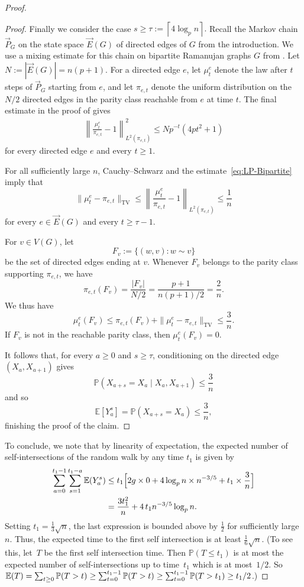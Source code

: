 \documentclass[11pt,a4paper]{article}
\theoremstyle{plain}
\newcommand{\Exp}{\mathop{\null\mathbb{E}}}
\renewcommand{\Pr}{\mathbb{P}}
\begin{document}
\begin{proof}
\begin{proof}
Finally we consider the case
$
s\geq 
\tau:=\left\lceil4\log_p n\right\rceil.
$
Recall the Markov chain $\vec P_G$ on the state space $\vec E(G)$ of directed edges of $G$ from the introduction. We use a mixing estimate for this chain on bipartite Ramanujan graphs $G$ from
\cite{LubetzkyPeres}. Let
$
N:=|\vec E(G)|=n(p+1).
$
For a directed edge $e$, let $\mu_t^e$ denote the law after $t$
steps of $\vec P_G$ starting from $e$,
and let $\pi_{e,t}$ denote the uniform distribution on the $N/2$
directed edges in the parity class reachable from $e$ at time $t$.
The final estimate in the proof of \cite[Corollary~3.8]{LubetzkyPeres} gives
\begin{align}\label{eq:LP-Bipartite}
\left\|
\frac{\mu_t^e}{\pi_{e,t}}-1
\right\|_{L^2(\pi_{e,t})}^2
\le
Np^{-t}\left(4pt^2+1\right)
\end{align}
for every directed edge $e$ and every $t\ge1$.

For all sufficiently large $n$, Cauchy--Schwarz and the estimate~\eqref{eq:LP-Bipartite} imply that
\[
\|\mu_t^e - \pi_{e,t}\|_{\textrm{TV}}
\leq
\left\|
\frac{\mu_t^e}{\pi_{e,t}}-1
\right\|_{L^2(\pi_{e,t})}
\le
\frac1n
\]
for every $e\in\vec E(G)$ and every $t\ge\tau-1$.

For $v\in V(G)$, let
\[
F_v:=\{(w,v):w\sim v\}
\]
be the set of directed edges ending at $v$. Whenever $F_v$ belongs
to the parity class supporting $\pi_{e,t}$, we have
\[
\pi_{e,t}(F_v)
=
\frac{|F_v|}{N/2}
=
\frac{p+1}{n(p+1)/2}
=
\frac2n.
\]
We thus have
\[
\mu_t^e(F_v)
\le
\pi_{e,t}(F_v)
+
\|\mu_t^e - \pi_{e,t}\|_{\textrm{TV}}
\le
\frac3n.
\]
If $F_v$ is not in the reachable parity class, then $\mu_t^e(F_v)=0$.


It follows that, for every $a\ge0$ and $s\ge\tau$, conditioning on
the directed edge $(X_{a},X_{a+1})$
gives
\[
\Pr(X_{a+s}=X_a\mid X_{a},X_{a+1})
\le
\frac3n
\]
and so
\[
\mathbb{E}\left[Y_a^s\right]=
\Pr(X_{a+s}=X_a)\le\frac3n,
\]
finishing the proof of the claim.
\end{proof}



To conclude, we note that by linearity of expectation, the expected number of self-intersections of the random walk by any time $t_1$ is given by
\begin{align*}
\sum_{a=0}^{t_1-1}\sum_{s=1}^{t_1-a}\Exp(Y_a^s)
&\leq t_1\Big[ 2g\times0+4\log_pn\times n^{-3/5}+t_1\times \frac3n\Big]\\
&=\frac{3t_1^2}n+4\,t_1n^{-3/5}\log_pn.
\end{align*}
Setting $t_1=\frac13\sqrt n$, the last expression is bounded above by $\frac12$ for sufficiently large $n$.  Thus, the expected time to the first self intersection is at least $\frac16\sqrt n$. (To see this, let~$T$ be the first self intersection time. Then
$\Pr(T \leq t_1)$ is at most the expected number of  self-intersections up to time~$t_1$ which is at most~$1/2$. So $\Exp(T) = \sum_{t\geq0} \Pr(T>t) \geq \sum_{t=0}^{t_1-1} \Pr(T>t) \geq\sum_{t=0}^{t_1-1} \Pr(T>t_1) \geq t_1/2$.) 
\end{proof}
\end{document}
